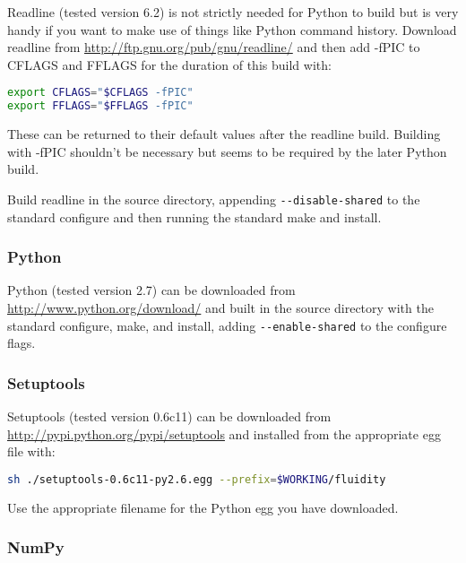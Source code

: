 Readline (tested version 6.2) is not strictly needed for Python to build but is
very handy if you want to make use of things like Python command history.
Download readline from \url{http://ftp.gnu.org/pub/gnu/readline/} and then add
-fPIC to CFLAGS and FFLAGS for the duration of this build with:

\begin{lstlisting}[language=bash]
export CFLAGS="$CFLAGS -fPIC"
export FFLAGS="$FFLAGS -fPIC"
\end{lstlisting}

These can be returned to their default values after the readline build.
Building with -fPIC shouldn't be necessary but seems to be required by the
later Python build.

Build readline in the source directory, appending
\lstinline[language=bash]+--disable-shared+ to the standard configure and then
running the standard make and install.

\subsubsection{Python}
\label{sec:required_libraries_python_python}

Python (tested version 2.7) can be downloaded from
\url{http://www.python.org/download/} and built in the source directory with
the standard configure, make, and install, adding
\lstinline[language=bash]+--enable-shared+ to the configure flags.

\subsubsection{Setuptools}
\label{sec:required_libraries_python_setuptools}

Setuptools (tested version 0.6c11) can be downloaded from
\url{http://pypi.python.org/pypi/setuptools} and installed from the appropriate
egg file with:

\begin{lstlisting}[language=bash]
sh ./setuptools-0.6c11-py2.6.egg --prefix=$WORKING/fluidity
\end{lstlisting}

Use the appropriate filename for the Python egg you have downloaded.

\subsubsection{NumPy}
\label{sec:required_libraries_python_numpy}


